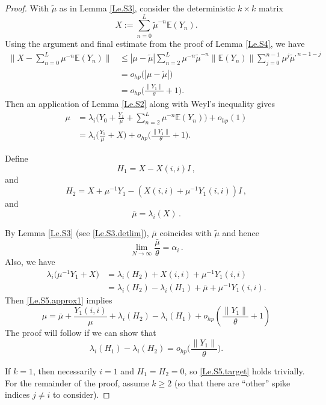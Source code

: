 \documentclass[11pt, reqno]{amsart}
\numberwithin{equation}{section}
\newcommand{\E}{\mbox{${\mathbb E}$}}
\begin{document}
\begin{proof}
With $\tilde{\mu}$ as in Lemma \ref{Le.S3}, consider the deterministic $k\times k$ matrix
\begin{equation}\label{eq:LeS5Xmatrix}
X := \sum_{n=0}^L \tilde{\mu}^{-n}\E(Y_n).
\end{equation}
Using the argument and final estimate from the proof of Lemma \ref{Le.S4}, we have
\begin{align*}
\Big\|X - \sum_{n=0}^L \mu^{-n}\E(Y_n)\Big\|
&\le |\mu-\tilde{\mu}| \sum_{n=2}^L \mu^{-n}\tilde{\mu}^{-n}\|\E(Y_n)\| \sum_{j=0}^{n-1}\mu^j\tilde{\mu}^{,n-1-j} \\
&= o_{hp}\big(|\mu-\tilde{\mu}|\big) \\
&= o_{hp}\Big(\frac{\|Y_1\|}{\theta} + 1\Big).
\end{align*}
Then an application of Lemma \ref{Le.S2} along with Weyl’s inequality gives
\begin{align}
\nonumber
\mu &= \lambda_i\Big(Y_0 + \frac{Y_1}{\mu} + \sum_{n=2}^L \mu^{-n}\E(Y_n)\Big) + o_{hp}(1)\\
\label{Le.S5.approx1}
&=\lambda_i\Big(\frac{Y_1}{\mu} + X\Big) + o_{hp}\Big(\frac{\|Y_1\|}{\theta} + 1\Big).
\end{align}

Define 
\[
H_1=X-X(i,i)I\,,
\]and
\[
H_2=X+\mu^{-1}Y_1-\left(X(i,i)+\mu^{-1}Y_1(i,i)\right)I\,,
\]and
\[
\bar\mu=\lambda_i(X)\,.
\]

By Lemma \ref{Le.S3} (see \eqref{Le.S3.detlim}), $\bar{\mu}$ coincides with $\tilde{\mu}$ and hence
\[
\lim_{N \to \infty}\frac{\bar\mu}{\theta} = \alpha_i\,.
\]
Also, we have
\begin{align*}
\lambda_i\big(\mu^{-1}Y_1 + X\big)
&= \lambda_i(H_2) + X(i,i) + \mu^{-1}Y_1(i,i) \\
&= \lambda_i(H_2) - \lambda_i(H_1) + \bar{\mu} + \mu^{-1}Y_1(i,i).
\end{align*}
Then \eqref{Le.S5.approx1} implies
\[
\mu = \bar\mu + \frac{Y_1(i,i)}{\mu} + \lambda_i(H_2)-\lambda_i(H_1) + o_{hp}\left(\frac{\|Y_1\|}{\theta}+1 \right)
\]
The proof will follow if we can show that
\begin{equation}\label{Le.S5.target}
\lambda_i(H_1) - \lambda_i(H_2) = o_{hp}\Big(\frac{\|Y_1\|}{\theta}\Big).
\end{equation}

If $k=1$, then necessarily $i=1$ and $H_1 = H_2 = 0$, so \eqref{Le.S5.target} holds trivially. For the remainder of the proof, assume $k\ge 2$ (so that there are “other” spike indices $j\neq i$ to consider).


\end{proof}
\end{document}
